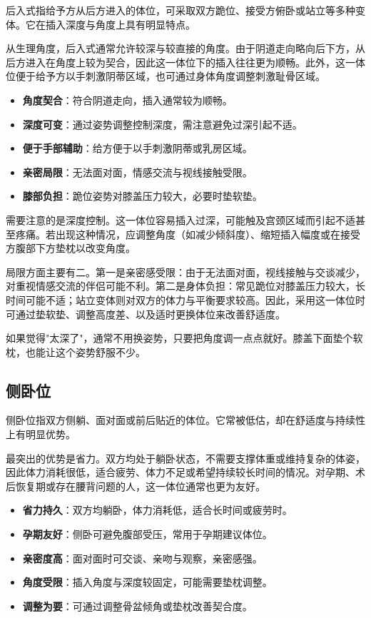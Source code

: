 \documentclass[12pt,UTF8]{ctexbook}
\newcommand{\keyword}[1]{\textbf{#1}}
\begin{document}
后入式指给予方从后方进入的体位，可采取双方跪位、接受方俯卧或站立等多种变体。它在插入深度与角度上具有明显特点。

从生理角度，后入式通常允许较深与较直接的角度。由于阴道走向略向后下方，从后方进入在角度上较为契合，因此这一体位下的插入往往更为顺畅。此外，这一体位便于给予方以手刺激阴蒂区域，也可通过身体角度调整刺激耻骨区域。

\begin{itemize}
  \item \keyword{角度契合}：符合阴道走向，插入通常较为顺畅。
  \item \keyword{深度可变}：通过姿势调整控制深度，需注意避免过深引起不适。
  \item \keyword{便于手部辅助}：给方便于以手刺激阴蒂或乳房区域。
  \item \keyword{亲密局限}：无法面对面，情感交流与视线接触受限。
  \item \keyword{膝部负担}：跪位姿势对膝盖压力较大，必要时垫软垫。
\end{itemize}

需要注意的是深度控制。这一体位容易插入过深，可能触及宫颈区域而引起不适甚至疼痛。若出现这种情况，应调整角度（如减少倾斜度）、缩短插入幅度或在接受方腹部下方垫枕以改变角度。

局限方面主要有二。第一是亲密感受限：由于无法面对面，视线接触与交谈减少，对重视情感交流的伴侣可能不利。第二是身体负担：常见跪位对膝盖压力较大，长时间可能不适；站立变体则对双方的体力与平衡要求较高。因此，采用这一体位时可通过垫软垫、调整高度差、以及适时更换体位来改善舒适度。

\begin{tcolorbox}[colback=pink!5!white,colframe=red!50!black,title=贴心小叮咛]
如果觉得"太深了"，通常不用换姿势，只要把角度调一点点就好。膝盖下面垫个软枕，也能让这个姿势舒服不少。
\end{tcolorbox}
\subsection{侧卧位}

侧卧位指双方侧躺、面对面或前后贴近的体位。它常被低估，却在舒适度与持续性上有明显优势。

最突出的优势是省力。双方均处于躺卧状态，不需要支撑体重或维持复杂的体姿，因此体力消耗很低，适合疲劳、体力不足或希望持续较长时间的情况。对孕期、术后恢复期或存在腰背问题的人，这一体位通常也更为友好。

\begin{itemize}
  \item \keyword{省力持久}：双方均躺卧，体力消耗低，适合长时间或疲劳时。
  \item \keyword{孕期友好}：侧卧可避免腹部受压，常用于孕期建议体位。
  \item \keyword{亲密度高}：面对面时可交谈、亲吻与观察，亲密感强。
  \item \keyword{角度受限}：插入角度与深度较固定，可能需要垫枕调整。
  \item \keyword{调整为要}：可通过调整骨盆倾角或垫枕改善契合度。
\end{itemize}
\end{document}
